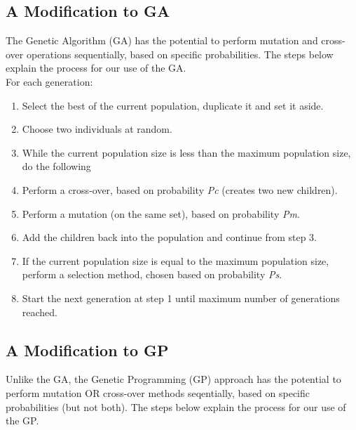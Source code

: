 \documentclass[a4paper,12pt]{article}
\begin{document}
\subsection{A Modification to GA}
The Genetic Algorithm (GA) has the potential to perform mutation and cross-over operations sequentially, based on specific probabilities. The steps below explain the process for our use of the GA.\\

For each generation:
\begin{enumerate}
\item Select the best of the current population, duplicate it and set it aside.
\item Choose two individuals at random.
\item While the current population size is less than the maximum population size, do the following
\item Perform a cross-over, based on probability \textit{Pc} (creates two new children).
\item Perform a mutation (on the same set), based on probability \textit{Pm}.
\item Add the children back into the population and continue from step 3.
\item If the current population size is equal to the maximum population size, perform a selection method, chosen based on probability \textit{Ps}.
\item Start the next generation at step 1 until maximum number of generations reached.
\end{enumerate}
  
\newpage
\subsection{A Modification to GP}
Unlike the GA, the Genetic Programming (GP) approach has the potential to perform mutation OR cross-over methods seqentially, based on specific probabilities (but not both). The steps below explain the process for our use of the GP.\\
\end{document}
